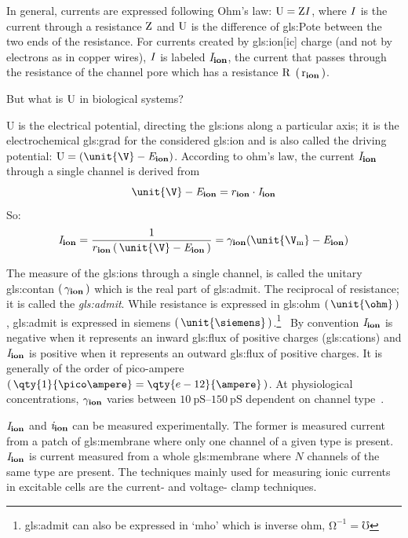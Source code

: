 \documentclass[class={myRUCProject}, crop=false]{standalone}
\begin{document}
In general, currents are expressed following Ohm's law: \(\mathrm{U}=\mathrm{Z}\mathit{I}\), where \(\mathit{I}\) is the current through a resistance \(\mathrm{Z}\) and \(\mathrm{U}\) is the difference of \gls{gls:Pote} between the two ends of the resistance. 
For currents created by \gls{gls:ion}[ic] charge (and not by electrons as in copper wires), \(\mathit{I}\) is labeled \(\mathit{I}_\mathbf{ion}\), the current that passes through the resistance of the channel pore which has a resistance \(\mathrm{R}\) \(\left(\,\mathrm{r}_\mathbf{ion}\,\right)\). 

But what is \(\mathrm{U}\) in biological systems? 

\unit{U} is the electrical potential, directing the \glspl{gls:ion} along a particular axis; it is the electrochemical \gls{gls:grad} for the considered \gls{gls:ion} and is also called the driving potential: \(\rmm{U}=(\unit{\V} - \equi\ion)\). According to ohm's law, the current \(\mathit{I}_\mathbf{ion}\) through a single channel is derived from 
\begin{equation}
  \unit{\V} - \equi\ion = r\ion \cdot \curr\ion
\end{equation}
So:
\begin{equation}\label{eq:cur2con}
  \curr\ion= \frac{1}{r\ion\br{\unit{\V} - \equi\ion}} = \ucon\ion(\unit{\V\membrane} - \equi\ion)
\end{equation}

The measure of the \glspl{gls:ion} through a single channel, is called the unitary \gls{gls:contan} \(\left(\,\gamma_\mathbf{ion}\,\right)\) which is the real part of \gls{gls:admit}. 
The reciprocal of resistance; it is called the \textit{\gls{gls:admit}}.
While resistance is expressed in \gls{gls:ohm} \(\br{\unit{\ohm}}\), \gls{gls:admit} is expressed in siemens \(\br{\unit{\siemens}}\).\footnote{\Gls{gls:admit} can also be expressed in `mho' which is inverse ohm, \(\unit{\ohm}^{-1} = \unit{\mho}\)}~
By convention \(\mathit{I}_\mathbf{ion}\) is negative when it represents an inward \gls{gls:flux} of positive charges (\glspl{gls:cation}) and \(\mathit{I}_\mathbf{ion}\) is positive when it represents an outward \gls{gls:flux} of positive charges. It is generally of the order of pico-ampere \(\br{\qty{1}{\pico\ampere}=\qty{e-12}{\ampere}}\). At physiological concentrations, \(\gamma_\mathbf{ion}\) varies between \(\qtyrange{10}{150}{\pico\siemens}\) dependent on channel type~\cite{Hammond2015ch4}.

\(\mathit{I}_\mathbf{ion}\) and \(\mathit{i}_\mathbf{ion}\) can be measured experimentally. 
The former is measured current from a patch of \gls{gls:membrane} where only one channel of a given type is present.
{}\(\mathit{I}_\mathbf{ion}\) is current measured from a whole \gls{gls:membrane} where \(N\) channels of the same type are present. The techniques mainly used for measuring ionic currents in excitable cells are the current- and voltage- clamp techniques.
\end{document}
